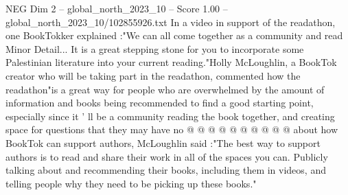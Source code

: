 \begin{textsample}{NEG Dim 2 – global\_north\_2023\_10 – Score 1.00 – global\_north\_2023\_10/102855926.txt}
In a video in support of the readathon, one BookTokker explained :"We can all come together as a community and read Minor Detail...
It is a great stepping stone for you to incorporate some Palestinian literature into your current reading."Holly McLoughlin, a BookTok creator who will be taking part in the readathon, commented how the readathon"is a great way for people who are overwhelmed by the amount of information and books being recommended to find a good starting point, especially since it ' ll be a community reading the book together, and creating space for questions that they may have no @ @ @ @ @ @ @ @ @ @ about how BookTok can support authors, McLoughlin said :"The best way to support authors is to read and share their work in all of the spaces you can.
Publicly talking about and recommending their books, including them in videos, and telling people why they need to be picking up these books."

\end{textsample}
